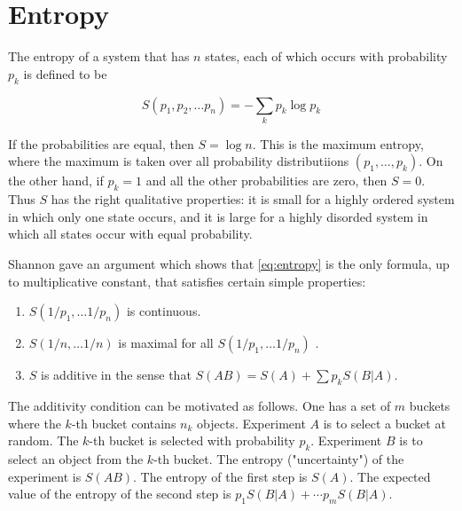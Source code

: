 

\section{Entropy}

The entropy of a system that has $n$ states, each of which occurs with probability $p_k$ is defined to be

\begin{equation}
\label{eq:entropy}
S(p_1, p_2, \ldots p_n) = - \sum_k p_k \log p_k
\end{equation}

If the probabilities are equal, then $S = \log n$.  This is the maximum entropy, where the maximum is taken over all probability distributiions $(p_1, \ldots , p_k)$.  On the other hand, if $p_k  = 1$ and all the other probabilities are zero, then $S = 0$.  Thus $S$ has the right qualitative properties: it is small for a highly ordered system in which only one state occurs, and it is large for a highly disorded system in which all states occur with equal probability.

Shannon gave an argument which shows that \eqref{eq:entropy} is the
only formula, up to multiplicative constant, that satisfies certain simple properties:

\begin{enumerate}


\item $S(1/p_1, \ldots 1/p_n)$  is continuous.

\item $S(1/n, \ldots 1/n) $ is maximal for all $S(1/p_1, \ldots 1/p_n)$ .

\item $S$ is additive in the sense that
$S(AB) = S(A) + \sum p_kS(B|A)$.

\end{enumerate}

The additivity condition can be motivated as follows. One has a set of $m$ buckets where the $k$-th bucket contains $n_k$ objects.  Experiment $A$ is to select a bucket at random.  The $k$-th bucket is selected with probability $p_k$.  Experiment $B$ is to select an object from the $k$-th bucket. The entropy ("uncertainty") of the experiment is $S(AB)$.  The entropy of the first step is $S(A)$.  The expected value of the entropy of the second step is $p_1S(B|A) + \cdots p_mS(B|A)$.

